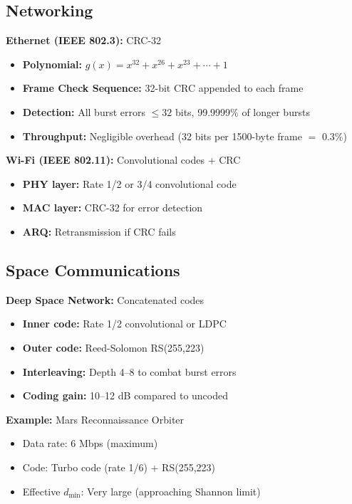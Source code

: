 \subsection{Networking}

\textbf{Ethernet (IEEE 802.3):} CRC-32
\begin{itemize}
\item \textbf{Polynomial:} $g(x) = x^{32} + x^{26} + x^{23} + \cdots + 1$
\item \textbf{Frame Check Sequence:} 32-bit CRC appended to each frame
\item \textbf{Detection:} All burst errors $\leq 32$ bits, 99.9999\% of longer bursts
\item \textbf{Throughput:} Negligible overhead (32 bits per 1500-byte frame $=$ 0.3\%)
\end{itemize}

\textbf{Wi-Fi (IEEE 802.11):} Convolutional codes + CRC
\begin{itemize}
\item \textbf{PHY layer:} Rate 1/2 or 3/4 convolutional code
\item \textbf{MAC layer:} CRC-32 for error detection
\item \textbf{ARQ:} Retransmission if CRC fails
\end{itemize}

\subsection{Space Communications}

\textbf{Deep Space Network:} Concatenated codes
\begin{itemize}
\item \textbf{Inner code:} Rate 1/2 convolutional or LDPC
\item \textbf{Outer code:} Reed-Solomon RS(255,223)
\item \textbf{Interleaving:} Depth 4--8 to combat burst errors
\item \textbf{Coding gain:} 10--12 dB compared to uncoded
\end{itemize}

\textbf{Example:} Mars Reconnaissance Orbiter
\begin{itemize}
\item Data rate: 6 Mbps (maximum)
\item Code: Turbo code (rate 1/6) + RS(255,223)
\item Effective $d_{\min}$: Very large (approaching Shannon limit)
\end{itemize}

